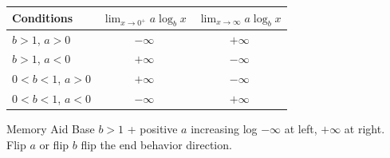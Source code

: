 \documentclass[aspectratio=169, 11pt]{beamer}
\begin{document}
\begin{frame}[t, plain]

  \vspace{0.2cm}
  \begin{center}
  \renewcommand{\arraystretch}{1.7}
  \begin{tabular}{|l|c|c|}
    \hline
    \textbf{Conditions} &
    $\displaystyle\lim_{x \to 0^+} a\log_b x$ &
    $\displaystyle\lim_{x \to \infty} a\log_b x$ \\
    \hline
    $b > 1$, $a > 0$ & $-\infty$ & $+\infty$ \\
    \hline
    $b > 1$, $a < 0$ & $+\infty$ & $-\infty$ \\
    \hline
    $0 < b < 1$, $a > 0$ & $+\infty$ & $-\infty$ \\
    \hline
    $0 < b < 1$, $a < 0$ & $-\infty$ & $+\infty$ \\
    \hline
  \end{tabular}
  \end{center}

  \vspace{0.2cm}
  \begin{block}{Memory Aid}
    Base $b > 1$ + positive $a$ \;\textrightarrow\; increasing log \;\textrightarrow\;
    $-\infty$ at left, $+\infty$ at right. \\
    Flip $a$ or flip $b$ \;\textrightarrow\; flip the end behavior direction.
  \end{block}
\end{frame}
\end{document}
